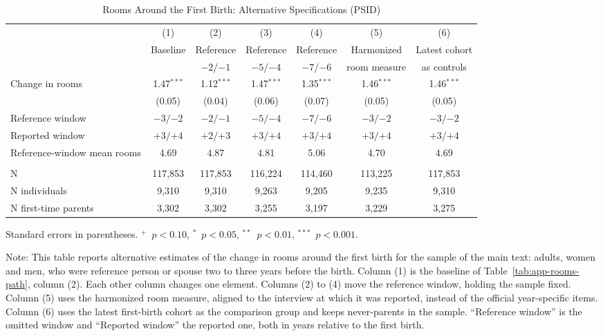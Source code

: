 \begin{table}[H]
\centering
\caption{Rooms Around the First Birth: Alternative Specifications (PSID)}
\label{tab:app-rooms-robust}
\footnotesize
\setlength{\tabcolsep}{4pt}
\begin{tabular}{@{}l cccccc@{}}
\toprule
 & (1) & (2) & (3) & (4) & (5) & (6) \\
 & Baseline & Reference & Reference & Reference & Harmonized & Latest cohort \\
 & & $-2/{-1}$ & $-5/{-4}$ & $-7/{-6}$ & room measure & as controls \\
\midrule
Change in rooms & 1.47$^{***}$ & 1.12$^{***}$ & 1.47$^{***}$ & 1.35$^{***}$ & 1.46$^{***}$ & 1.46$^{***}$ \\
 & (0.05) & (0.04) & (0.06) & (0.07) & (0.05) & (0.05) \\
Reference window & $-3/{-2}$ & $-2/{-1}$ & $-5/{-4}$ & $-7/{-6}$ & $-3/{-2}$ & $-3/{-2}$ \\
Reported window & $+3/{+4}$ & $+2/{+3}$ & $+3/{+4}$ & $+3/{+4}$ & $+3/{+4}$ & $+3/{+4}$ \\
Reference-window mean rooms & 4.69 & 4.87 & 4.81 & 5.06 & 4.70 & 4.69 \\
\addlinespace
\multicolumn{7}{@{}l}{\textit{Observations}} \\
N & 117,853 & 117,853 & 116,224 & 114,460 & 113,225 & 117,853 \\
N individuals & 9,310 & 9,310 & 9,263 & 9,205 & 9,235 & 9,310 \\
N first-time parents & 3,302 & 3,302 & 3,255 & 3,197 & 3,229 & 3,275 \\
\bottomrule
\end{tabular}
\par\smallskip
\begin{minipage}{0.97\linewidth}
\footnotesize Standard errors in parentheses. $^{+}$~$p<0.10$, $^{*}$~$p<0.05$, $^{**}$~$p<0.01$, $^{***}$~$p<0.001$.

\smallskip
Note: This table reports alternative estimates of the change in rooms around
the first birth for the sample of the main text: adults, women and men, who
were reference person or spouse two to three years before the birth. Column
(1) is the baseline of Table~\ref{tab:app-rooms-path}, column (2). Each other
column changes one element. Columns (2) to (4) move the reference window,
holding the sample fixed. Column (5) uses the harmonized room measure, aligned
to the interview at which it was reported, instead of the official
year-specific items. Column (6) uses the latest first-birth cohort as the
comparison group and keeps never-parents in the sample. ``Reference window''
is the omitted window and ``Reported window'' the reported one, both in years
relative to the first birth.
\end{minipage}
\end{table}

